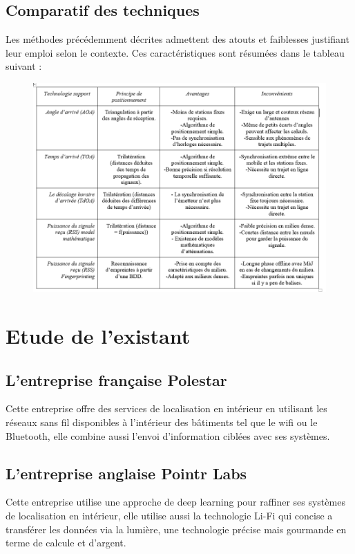 \documentclass[12pt,a4paper]{report}
\begin{document}
\subsection{Comparatif des techniques}

Les méthodes précédemment décrites admettent des atouts et faiblesses justifiant leur emploi selon le contexte. Ces caractéristiques sont résumées dans le tableau suivant :

  \begin{figure}[H]
 	\centering
 	\includegraphics[width=1.1\linewidth]{Pics/tableau.PNG}
  \end{figure}


\section{Etude de l’existant }
\subsection{L’entreprise française Polestar}
Cette entreprise offre des services de localisation en intérieur en utilisant les réseaux sans fil disponibles à l’intérieur des bâtiments tel que le wifi ou le Bluetooth, elle combine aussi l’envoi d’information ciblées avec ses systèmes.

\subsection{L’entreprise anglaise Pointr Labs}
Cette entreprise utilise une approche de deep learning pour raffiner ses systèmes de localisation en intérieur, elle utilise aussi la technologie Li-Fi qui concise a transférer les données via la lumière, une technologie précise mais gourmande en terme de calcule et d’argent.
\end{document}

